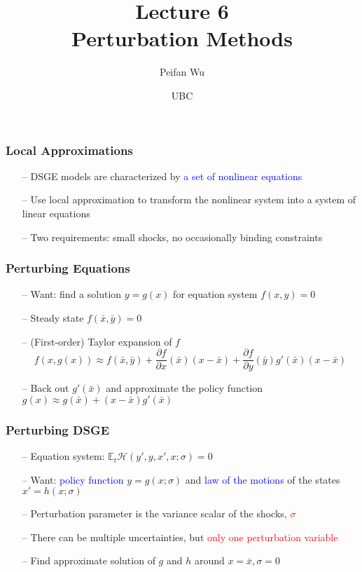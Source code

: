 \documentclass[aspectratio=169, 11pt]{beamer}
\begin{document}
\title{Lecture 6 \\ Perturbation Methods}
\author[Wu]{Peifan Wu}
\date{UBC}

\begin{frame}
\titlepage
\end{frame}

\begin{frame}
\frametitle{Local Approximations}
  \begin{itemize}
    \item[--] DSGE models are characterized by \textcolor{blue}{a set of nonlinear equations}
    \bigskip
    \item[--] Use local approximation to transform the nonlinear system into a system of linear equations
    \bigskip
    \item[--] Two requirements: small shocks, no occasionally binding constraints
  \end{itemize}
\end{frame}

\begin{frame}
\frametitle{Perturbing Equations}
  \begin{itemize}
    \item[--] Want: find a solution $y=g\left(x\right)$ for equation system $f\left(x,y\right)=0$
    \item[--] Steady state $f\left(\bar{x},\bar{y}\right)=0$
    \bigskip
    \item[--] (First-order) Taylor expansion of $f$
    \[
      f\left(x,g\left(x\right)\right)\approx f\left(\bar{x},\bar{y}\right)+\frac{\partial f}{\partial x}\left(\bar{x}\right)\left(x-\bar{x}\right)+\frac{\partial f}{\partial y}\left(\bar{y}\right)g'\left(\bar{x}\right)\left(x-\bar{x}\right)
    \]
    \bigskip
    \item[--] Back out $g'\left(\bar{x}\right)$ and approximate the policy function $g\left(x\right)\approx g\left(\bar{x}\right)+\left(x-\bar{x}\right)g'\left(\bar{x}\right)$
  \end{itemize}
\end{frame}

\begin{frame}
\frametitle{Perturbing DSGE}
  \begin{itemize}
    \item[--] Equation system:  $\mathbb{E}_{t}\mathcal{H}\left(y',y,x',x;\sigma\right)=0$
    \item[--] Want: \textcolor{blue}{policy function} $y=g\left(x;\sigma\right)$ and \textcolor{blue}{law of the motions} of the states $x'=h\left(x;\sigma\right)$
    \bigskip
    \item[--] Perturbation parameter is the variance scalar of the shocks, \textcolor{red}{$\sigma$}
    \item[--] There can be multiple uncertainties, but \textcolor{red}{only one perturbation variable}
    \bigskip
    \item[--] Find approximate solution of $g$ and $h$ around $x=\bar{x},\sigma=0$
  \end{itemize}
\end{frame}
\end{document}
